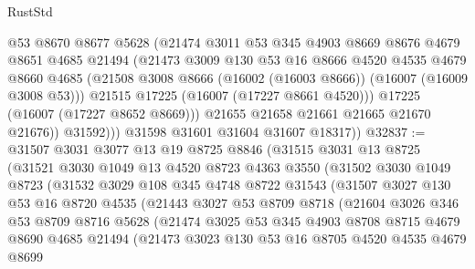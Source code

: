 \begin{lexlean}{RustStd}
\begin{coremodule}
                  @53
                  @8670
                  @8677
                  @5628
                  (@21474
                    @3011
                    @53
                    @345
                    @4903
                    @8669
                    @8676
                    @4679
                    @8651
                    @4685
                    @21494
                    (@21473
                      @3009
                      @130
                      @53
                      @16
                      @8666
                      @4520
                      @4535
                      @4679
                      @8660
                      @4685
                      (@21508 @3008 @8666 (@16002 (@16003 @8666)) (@16007 (@16009 @3008 @53)))
                      @21515
                      @17225
                      (@16007 (@17227 @8661 @4520)))
                    @17225
                    (@16007 (@17227 @8652 @8669)))
                  @21655
                  @21658
                  @21661
                  @21665
                  @21670
                  @21676))
              @31592)))
        @31598
        @31601
        @31604
        @31607
        @18317))
@32837 := @31507
    @3031
    @3077
    @13
    @19
    @8725
    @8846
    (@31515
      @3031
      @13
      @8725
      (@31521
        @3030
        @1049
        @13
        @4520
        @8723
        @4363
        @3550
        (@31502
          @3030
          @1049
          @8723
          (@31532
            @3029
            @108
            @345
            @4748
            @8722
            @31543
            (@31507
              @3027
              @130
              @53
              @16
              @8720
              @4535
              (@21443
                @3027
                @53
                @8709
                @8718
                (@21604
                  @3026
                  @346
                  @53
                  @8709
                  @8716
                  @5628
                  (@21474
                    @3025
                    @53
                    @345
                    @4903
                    @8708
                    @8715
                    @4679
                    @8690
                    @4685
                    @21494
                    (@21473
                      @3023
                      @130
                      @53
                      @16
                      @8705
                      @4520
                      @4535
                      @4679
                      @8699

\end{coremodule}
\end{lexlean}
